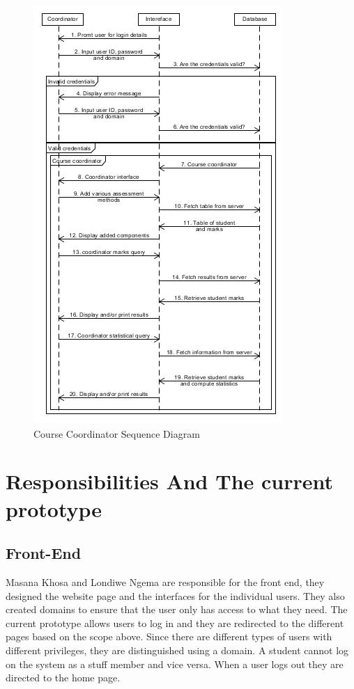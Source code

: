 \documentclass[10pt,onecolumn]{RequimentsGathering}
\begin{document}
	
	\begin{center}
		\begin{figure}[h]
			\centering
			\includegraphics[trim={0cm 0cm 0cm 0cm },clip,scale = 1.1]{CoordinatorSequence}
			\caption{Course Coordinator Sequence Diagram}
		\end{figure}
	\end{center}
	\newpage
	
\section{Responsibilities And The current prototype}

\subsection{Front-End}

Masana Khosa and Londiwe Ngema are responsible for the front end, they designed the website page and the interfaces for the individual users. They also created domains to ensure that the user only has access to what they need. The current prototype allows users to log in and they are redirected to the different pages based on the scope above. Since there are different types of users with different privileges, they are distinguished using a domain. A student cannot log on the system as a stuff member and vice versa. When a user logs out they are directed to the home page.
\end{document}
